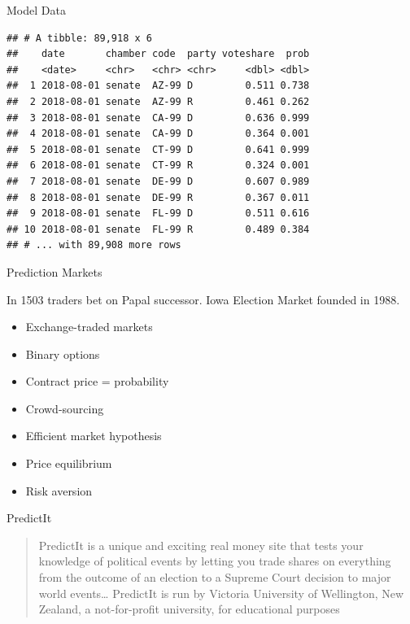 \documentclass[ignorenonframetext,]{beamer}
\providecommand{\tightlist}{%
  \setlength{\itemsep}{0pt}\setlength{\parskip}{0pt}}
\begin{document}
\begin{frame}[fragile]{Model Data}

\begin{verbatim}
## # A tibble: 89,918 x 6
##    date       chamber code  party voteshare  prob
##    <date>     <chr>   <chr> <chr>     <dbl> <dbl>
##  1 2018-08-01 senate  AZ-99 D         0.511 0.738
##  2 2018-08-01 senate  AZ-99 R         0.461 0.262
##  3 2018-08-01 senate  CA-99 D         0.636 0.999
##  4 2018-08-01 senate  CA-99 D         0.364 0.001
##  5 2018-08-01 senate  CT-99 D         0.641 0.999
##  6 2018-08-01 senate  CT-99 R         0.324 0.001
##  7 2018-08-01 senate  DE-99 D         0.607 0.989
##  8 2018-08-01 senate  DE-99 R         0.367 0.011
##  9 2018-08-01 senate  FL-99 D         0.511 0.616
## 10 2018-08-01 senate  FL-99 R         0.489 0.384
## # ... with 89,908 more rows
\end{verbatim}

\end{frame}

\begin{frame}{Prediction Markets}

In 1503 traders bet on Papal successor. Iowa Election Market founded in
1988.

\begin{itemize}
\tightlist
\item
  Exchange-traded markets
\item
  Binary options
\item
  Contract price = probability
\item
  Crowd-sourcing
\item
  Efficient market hypothesis
\item
  Price equilibrium
\item
  Risk aversion
\end{itemize}

\end{frame}

\begin{frame}{PredictIt}

\begin{quote}
PredictIt is a unique and exciting real money site that tests your
knowledge of political events by letting you trade shares on everything
from the outcome of an election to a Supreme Court decision to major
world events\ldots{} PredictIt is run by Victoria University of
Wellington, New Zealand, a not-for-profit university, for educational
purposes
\end{quote}

\end{frame}
\end{document}
